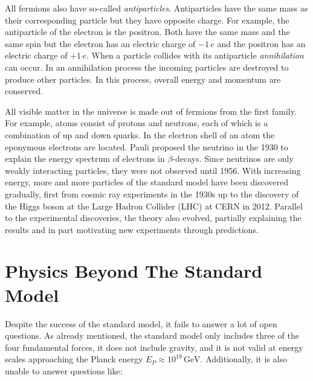 \documentclass[a4paper,11pt,twosided,final,german,openbib,pdftex,listof=totoc,bibliography=totoc]{scrbook}
\begin{document}
All fermions also have so-called \textit{antiparticles}. Antiparticles have the same mass as their corresponding particle but they have opposite charge. For example, the antiparticle of the electron is the positron. Both have the same mass and the same spin but the electron has an electric charge of $-1\,e$ and the positron has an electric charge of $+1\,e$. When a particle collides with its antiparticle \textit{annihilation} can occur. In an annihilation process the incoming particles are destroyed to produce other particles. In this process, overall energy and momentum are conserved.
\newline


All visible matter in the universe is made out of fermions from the first family. For example, atoms consist of protons and neutrons, each of which is a combination of up and down quarks. In the electron shell of an atom the eponymous electrons are located. Pauli proposed the neutrino in the 1930 to explain the energy spectrum of electrons in $\beta$-decays. Since neutrinos are only weakly interacting particles, they were not observed until 1956.\cite{REINES19941} With increasing energy, more and more particles of the standard model have been discovered gradually, first from cosmic ray experiments in the 1930s up to the discovery of the Higgs boson at the Large Hadron Collider (LHC) at CERN in 2012. Parallel to the experimental discoveries, the theory also evolved, partially explaining the results and in part motivating new experiments through predictions.


\section{Physics Beyond The Standard Model}

Despite the success of the standard model, it fails to answer a lot of open questions. As already mentioned, the standard model only includes three of the four fundamental forces, it does not include gravity, and it is not valid at energy scales approaching the Planck energy $E_P \approx 10^{19}\,\textrm{GeV} $.\cite{sivaram2007special} Additionally, it is also unable to answer questions like:
\end{document}
